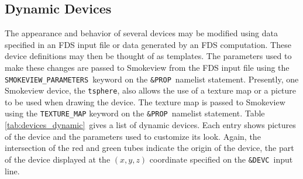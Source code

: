 \subsection{Dynamic Devices}
 The appearance and behavior of several devices may be modified using data specified in an FDS input file
 or data generated by an FDS computation.  These device definitions may then be thought of as templates.
 The parameters used to make these changes are passed to Smokeview from the FDS input file using the {\tt SMOKEVIEW\_PARAMETERS}\ keyword on the {\tt \&PROP}\ namelist statement.  Presently, one Smokeview device, the {\tt tsphere}, also allows the use of a texture map or a picture to be used when drawing the device.  The texture map is passed to Smokeview using the {\tt TEXTURE\_MAP} keyword on the {\tt \&PROP}\ namelist statement.
Table \ref{tab:devices_dynamic}\ gives a list of dynamic devices.  Each entry shows pictures of the device and the parameters used to customize its look.  Again, the intersection of the red and green tubes indicate the origin of the device, the part of the device displayed at the $(x,y,z)$ coordinate specified on the {\tt \&DEVC}\ input line.

